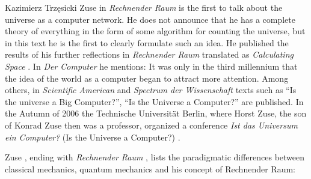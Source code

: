 \begin{artengenv}{Kazimierz Trzęsicki}
 Zuse in \emph{Rechnender Raum} \parencite*{Zuse1967} is the first to talk about the universe as a computer network. He does not announce that he has a complete theory of everything in the form of some algorithm for counting the universe, but in this text he is the first to clearly formulate such an idea. He published the results of his further reflections in \emph{Rechnender Raum} \parencite*{Zuse1969} translated as
\emph{Calculating Space}
  \parencite* {Zuse2012}. In \emph {Der Computer} \parencite* {Zuse2010} he mentions: 
 It was only in the third millennium that the idea of the world as a computer began to attract more attention. Among others, in \emph{Scientific American} and \emph{Spectrum der Wissenschaft} texts such as ``Is the universe a Big Computer?'', ``Is the Universe a Computer?'' are published. In the Autumn of 2006 the Technische Universit{\"a}t Berlin, where Horst Zuse, the son of Konrad Zuse then was a professor, organized a conference \emph{Ist das Universum ein Computer?} (Is the Universe a Computer?) \parencite[p.61]{German2012}.

Zuse \parencite*[p.56]{Zuse2012a}, ending with \emph{Rechnender Raum} \parencite*[p.344]{Zuse1967}, lists the paradigmatic differences between classical mechanics, quantum mechanics and his concept of Rechnender Raum:


\end{artengenv}
